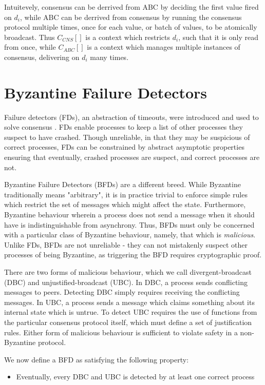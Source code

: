 Intuitevely, consensus can be derrived from ABC by deciding the first value fired on $d_i$,
while ABC can be derrived from consensus by running the consensus protocol multiple times,
once for each value, or batch of values, to be atomically broadcast.
Thus $ C_{CNS}[ ] $ is a context which restricts $d_i$, such that it is only read from once,
while $ C_{ABC}[ ] $ is a context which manages multiple instances of consensus, delivering on $d_i$ many times.


\section{Byzantine Failure Detectors}
Failure detectors (FDs), an abstraction of timeouts,
were introduced and used to solve consensus \cite{chandra1996unreliable}.
FDs enable processes to keep a list of other processes they suspect to have crashed.
Though unreliable, in that they may be suspicious of correct processes,
FDs can be constrained by abstract asymptotic properties ensuring that 
eventually, crashed processes are suspect, and correct processes are not.

Byzantine Failure Detectors (BFDs) are a different breed.
While Byzantine traditionally means "arbitrary", 
it is in practice trivial to enforce simple rules which restrict
the set of messages which might affect the state.
Furthermore, Byzantine behaviour wherein a process does not send a message when it should have 
is indistinguishable from asynchrony.
Thus, BFDs must only be concerned with a particular class of Byzantine behaviour,
namely, that which is \emph{malicious}.
Unlike FDs, BFDs are not unreliable - they can not mistakenly suspect other processes
of being Byzantine, as triggering the BFD requires cryptographic proof.

There are two forms of malicious behaviour, which we call divergent-broadcast (DBC)
and unjustified-broadcast (UBC). In DBC, a process sends conflicting messages to peers.
Detecting DBC simply requires receiving the conflicting messages.
In UBC, a process sends a message which claims something about its internal state which is untrue.
To detect UBC requires the use of functions from the particular consensus protocol itself,
which must define a set of justification rules.
Either form of malicious behaviour is sufficient to violate safety in a non-Byzantine protocol.

We now define a BFD as satisfying the following property:

\begin{itemize}
\item{Eventually, every DBC and UBC is detected by at least one correct process}
\end{itemize}

